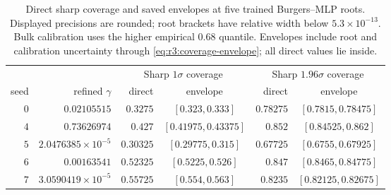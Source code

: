 \begin{table}[t]
\centering\small\setlength{\tabcolsep}{4pt}
\begin{tabular}{@{}rrrcr c@{}}
\toprule
 & & \multicolumn{2}{c}{Sharp $1\sigma$ coverage} & \multicolumn{2}{c}{Sharp $1.96\sigma$ coverage} \\
\cmidrule(lr){3-4}\cmidrule(l){5-6}
seed & refined $\gamma$ & direct & envelope & direct & envelope \\
\midrule
$0$ & $0.02105515$ & $0.3275$ & $[0.323,0.333]$ & $0.78275$ & $[0.7815,0.78475]$ \\
$4$ & $0.73626974$ & $0.427$ & $[0.41975,0.43375]$ & $0.852$ & $[0.84525,0.862]$ \\
$5$ & $2.0476385\times10^{-5}$ & $0.30325$ & $[0.29775,0.315]$ & $0.67725$ & $[0.6755,0.67925]$ \\
$6$ & $0.00163541$ & $0.52325$ & $[0.5225,0.526]$ & $0.847$ & $[0.8465,0.84775]$ \\
$7$ & $3.0590419\times10^{-5}$ & $0.55725$ & $[0.554,0.563]$ & $0.8235$ & $[0.82125,0.82675]$ \\
\bottomrule
\end{tabular}
\caption{Direct sharp coverage and saved envelopes at five trained Burgers--MLP
roots. Displayed precisions are rounded; root brackets have relative width below
$5.3\times10^{-13}$. Bulk calibration uses the higher empirical $0.68$ quantile.
Envelopes include root and calibration uncertainty through
\eqref{eq:r3:coverage-envelope}; all direct values lie inside.}
\label{tab:r3-roots}
\end{table}
